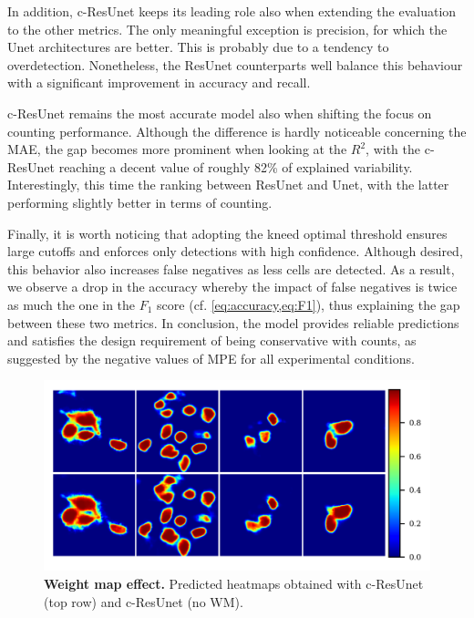 In addition, c-ResUnet keeps its leading role also when extending the evaluation to the other metrics.
The only meaningful exception is precision, for which the Unet architectures are better. This is probably due to a tendency to overdetection. 
Nonetheless, the ResUnet counterparts well balance this behaviour with a significant improvement in accuracy and recall.

c-ResUnet remains the most accurate model also when shifting the focus on counting performance. Although the difference is hardly noticeable concerning the MAE, the gap becomes more prominent when looking at the $R^2$, with the c-ResUnet reaching a decent value of roughly 82\% of explained variability.
Interestingly, this time the ranking between ResUnet and Unet, with the latter performing slightly better in terms of counting.

Finally, it is worth noticing that adopting the kneed optimal threshold ensures large cutoffs and enforces only detections with high confidence.
Although desired, this behavior also increases false negatives as less cells are detected. 
As a result, we observe a drop in the accuracy whereby the impact of false negatives is twice as much the one in the $F_1$ score (cf. \cref{eq:accuracy,eq:F1}), thus explaining the gap between these two metrics.
In conclusion, the model provides reliable predictions and satisfies the design requirement of being conservative with counts, as suggested by the negative values of MPE for all experimental conditions.

\begin{figure}[!b]
\centering
\includegraphics[width=\textwidth]{figures/130_methods/weigths_effect.png}
\caption{\textbf{Weight map effect.} 
Predicted heatmaps obtained with c-ResUnet (top row) and c-ResUnet (no WM).} 
\label{fig:weigths_effect}
\end{figure}
